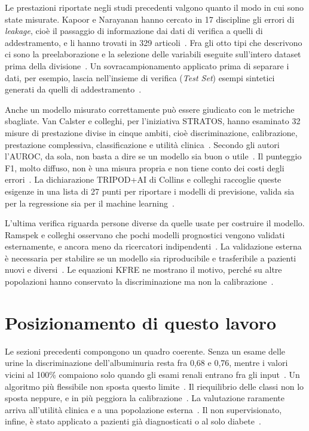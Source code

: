 \documentclass[a4paper, 12pt, oneside]{book}
\begin{document}
Le prestazioni riportate negli studi precedenti valgono quanto il modo in cui sono state misurate. Kapoor e Narayanan hanno cercato in 17 discipline gli errori di \emph{leakage}, cioè il passaggio di informazione dai dati di verifica a quelli di addestramento, e li hanno trovati in 329 articoli~\cite{kapoor_leakage_2023}. Fra gli otto tipi che descrivono ci sono la preelaborazione e la selezione delle variabili eseguite sull'intero dataset prima della divisione~\cite{kapoor_leakage_2023}. Un sovracampionamento applicato prima di separare i dati, per esempio, lascia nell'insieme di verifica (\textit{Test Set}) esempi sintetici generati da quelli di addestramento~\cite{kapoor_leakage_2023}. 

Anche un modello misurato correttamente può essere giudicato con le metriche sbagliate. Van Calster e colleghi, per l'iniziativa STRATOS, hanno esaminato 32 misure di prestazione divise in cinque ambiti, cioè discriminazione, calibrazione, prestazione complessiva, classificazione e utilità clinica~\cite{van_calster_evaluation_2025}. Secondo gli autori l'AUROC, da sola, non basta a dire se un modello sia buon o utile~\cite{van_calster_evaluation_2025}. Il punteggio F1, molto diffuso, non è una misura propria e non tiene conto dei costi degli errori~\cite{van_calster_evaluation_2025}. La dichiarazione TRIPOD+AI di Collins e colleghi raccoglie queste esigenze in una lista di 27 punti per riportare i modelli di previsione, valida sia per la regressione sia per il machine learning~\cite{collins_tripodai_2024}.

L'ultima verifica riguarda persone diverse da quelle usate per costruire il modello. Ramspek e colleghi osservano che pochi modelli prognostici vengono validati esternamente, e ancora meno da ricercatori indipendenti~\cite{ramspek_external_2021}. La validazione esterna è necessaria per stabilire se un modello sia riproducibile e trasferibile a pazienti nuovi e diversi~\cite{ramspek_external_2021}. Le equazioni KFRE ne mostrano il motivo, perché su altre popolazioni hanno conservato la discriminazione ma non la calibrazione~\cite{tangri_multinational_2016}. 

\section{Posizionamento di questo lavoro}

Le sezioni precedenti compongono un quadro coerente. Senza un esame delle urine la discriminazione dell'albuminuria resta fra 0,68 e 0,76, mentre i valori vicini al 100\% compaiono solo quando gli esami renali entrano fra gli input~\cite{muntner_development_2011,bragg-gresham_using_2025,yoo_merwacs_2026,qin_machine_2020}. Un algoritmo più flessibile non sposta questo limite~\cite{christodoulou_systematic_2019}. Il riequilibrio delle classi non lo sposta neppure, e in più peggiora la calibrazione~\cite{van_den_goorbergh_harm_2022}. La valutazione raramente arriva all'utilità clinica e a una popolazione esterna~\cite{haris_prediction_2024,ramspek_external_2021}. Il non supervisionato, infine, è stato applicato a pazienti già diagnosticati o al solo diabete~\cite{zheng_subtyping_2021,ahlqvist_novel_2018}.
\end{document}

